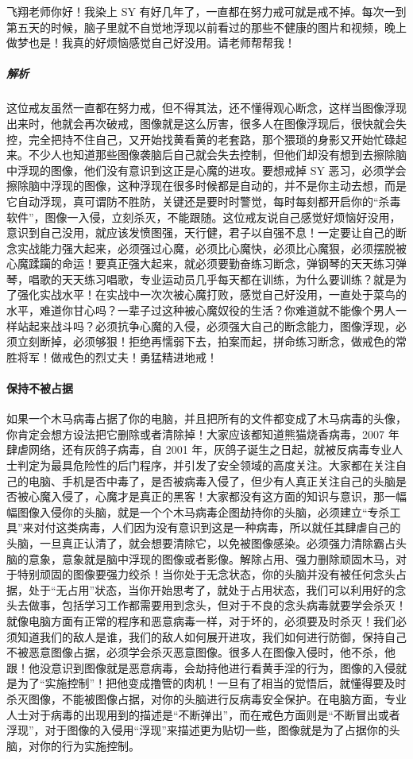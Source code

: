 \begin{case}
    飞翔老师你好！我染上 SY 有好几年了，一直都在努力戒可就是戒不掉。每次一到第五天的时候，脑子里就不自觉地浮现以前看过的那些不健康的图片和视频，晚上做梦也是！我真的好烦恼感觉自己好没用。请老师帮帮我！
    \subparagraph{解析} 这位戒友虽然一直都在努力戒，但不得其法，还不懂得观心断念，这样当图像浮现出来时，他就会再次破戒，图像就是这么厉害，很多人在图像浮现后，很快就会失控，完全把持不住自己，又开始找黄看黄的老套路，那个猥琐的身影又开始忙碌起来。不少人也知道那些图像袭脑后自己就会失去控制，但他们却没有想到去擦除脑中浮现的图像，他们没有意识到这正是心魔的进攻。要想戒掉 SY 恶习，必须学会擦除脑中浮现的图像，这种浮现在很多时候都是自动的，并不是你主动去想，而是它自动浮现，真可谓防不胜防，关键还是要时时警觉，每时每刻都开启你的“杀毒软件”，图像一入侵，立刻杀灭，不能跟随。这位戒友说自己感觉好烦恼好没用，意识到自己没用，就应该发愤图强，天行健，君子以自强不息！一定要让自己的断念实战能力强大起来，必须强过心魔，必须比心魔快，必须比心魔狠，必须摆脱被心魔蹂躏的命运！要真正强大起来，就必须要勤奋练习断念，弹钢琴的天天练习弹琴，唱歌的天天练习唱歌，专业运动员几乎每天都在训练，为什么要训练？就是为了强化实战水平！在实战中一次次被心魔打败，感觉自己好没用，一直处于菜鸟的水平，难道你甘心吗？一辈子过这种被心魔奴役的生活？你难道就不能像个男人一样站起来战斗吗？必须抗争心魔的入侵，必须强大自己的断念能力，图像浮现，必须立刻断掉，必须够狠！拒绝再懦弱下去，拍案而起，拼命练习断念，做戒色的常胜将军！做戒色的烈丈夫！勇猛精进地戒！
\end{case}

\paragraph{保持不被占据}

如果一个木马病毒占据了你的电脑，并且把所有的文件都变成了木马病毒的头像，你肯定会想方设法把它删除或者清除掉！大家应该都知道熊猫烧香病毒，2007 年肆虐网络，还有灰鸽子病毒，自 2001 年，灰鸽子诞生之日起，就被反病毒专业人士判定为最具危险性的后门程序，并引发了安全领域的高度关注。大家都在关注自己的电脑、手机是否中毒了，是否被病毒入侵了，但少有人真正关注自己的头脑是否被心魔入侵了，心魔才是真正的黑客！大家都没有这方面的知识与意识，那一幅幅图像入侵你的头脑，就是一个个木马病毒企图劫持你的头脑，必须建立“专杀工具”来对付这类病毒，人们因为没有意识到这是一种病毒，所以就任其肆虐自己的头脑，一旦真正认清了，就会想要清除它，以免被图像感染。必须强力清除霸占头脑的意象，意象就是脑中浮现的图像或者影像。解除占用、强力删除顽固木马，对于特别顽固的图像要强力绞杀！当你处于无念状态，你的头脑并没有被任何念头占据，处于“无占用”状态，当你开始思考了，就处于占用状态，我们可以利用好的念头去做事，包括学习工作都需要用到念头，但对于不良的念头病毒就要学会杀灭！就像电脑方面有正常的程序和恶意病毒一样，对于坏的，必须要及时杀灭！我们必须知道我们的敌人是谁，我们的敌人如何展开进攻，我们如何进行防御，保持自己不被恶意图像占据，必须学会杀灭恶意图像。很多人在图像入侵时，他不杀，他跟！他没意识到图像就是恶意病毒，会劫持他进行看黄手淫的行为，图像的入侵就是为了“实施控制”！把他变成撸管的肉机！一旦有了相当的觉悟后，就懂得要及时杀灭图像，不能被图像占据，对你的头脑进行反病毒安全保护。在电脑方面，专业人士对于病毒的出现用到的描述是“不断弹出”，而在戒色方面则是“不断冒出或者浮现”，对于图像的入侵用“浮现”来描述更为贴切一些，图像就是为了占据你的头脑，对你的行为实施控制。

